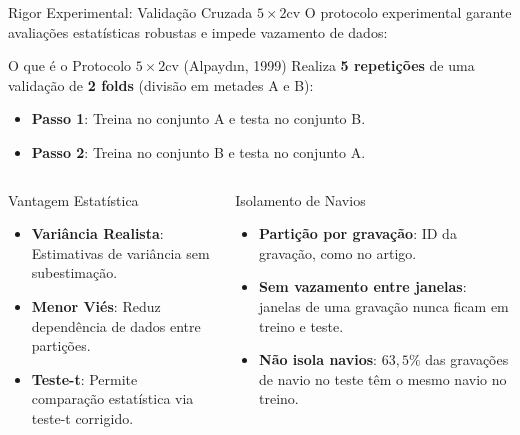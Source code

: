 \documentclass{beamer}
\begin{document}
\begin{frame}{Rigor Experimental: Validação Cruzada $5\times2$cv}
    \footnotesize
    O protocolo experimental garante avaliações estatísticas robustas e impede vazamento de dados:
    
    \vspace{0.15cm}
    \begin{block}{\footnotesize O que é o Protocolo $5\times2$cv (Alpaydın, 1999)}
        \scriptsize
        Realiza \textbf{5 repetições} de uma validação de \textbf{2 folds} (divisão em metades A e B):
        \begin{itemize}
            \setlength{\itemsep}{1pt}
            \setlength{\parskip}{0pt}
            \setlength{\parsep}{0pt}
            \item \textbf{Passo 1}: Treina no conjunto A e testa no conjunto B.
            \item \textbf{Passo 2}: Treina no conjunto B e testa no conjunto A.
        \end{itemize}
    \end{block}

    \vspace{0.1cm}
    \begin{columns}[t]
        \begin{block}{\footnotesize Vantagem Estatística}
            \scriptsize
            \begin{itemize}
                \setlength{\itemsep}{1pt}
                \setlength{\parskip}{0pt}
                \setlength{\parsep}{0pt}
                \item \textbf{Variância Realista}: Estimativas de variância sem subestimação.
                \item \textbf{Menor Viés}: Reduz dependência de dados entre partições.
                \item \textbf{Teste-t}: Permite comparação estatística via teste-t corrigido.
            \end{itemize}
        \end{block}

        \begin{block}{\footnotesize Isolamento de Navios}
            \scriptsize
            \begin{itemize}
                \setlength{\itemsep}{1pt}
                \setlength{\parskip}{0pt}
                \setlength{\parsep}{0pt}
                \item \textbf{Partição por gravação}: ID da gravação, como no artigo.
                \item \textbf{Sem vazamento entre janelas}: janelas de uma gravação nunca ficam em treino e teste.
                \item \textbf{Não isola navios}: $63,5\%$ das gravações de navio no teste têm o mesmo navio no treino.
            \end{itemize}
        \end{block}
    \end{columns}
\end{frame}
\end{document}
